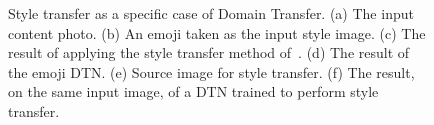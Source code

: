 \documentclass{article} %
\begin{document}
\begin{figure}[t]
\centering
{}

\caption{\label{fig:styletransfer}Style transfer as a specific case of Domain Transfer. (a) The input content photo. (b) An emoji taken as the input style image. (c) The result of applying the style transfer method of~\cite{styletransfer}.  (d) The result of the emoji DTN.  (e)  Source image for style transfer. (f) The result, on the same input image, of a DTN trained to perform style transfer.}
\end{figure}
\end{document}
